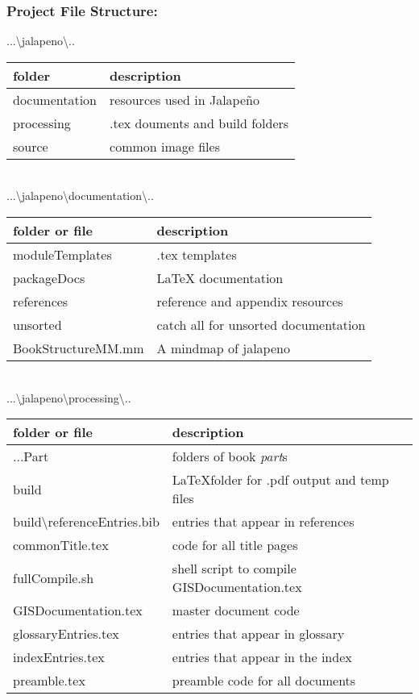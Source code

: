 \documentclass[class=book , crop=false]{standalone}
\begin{document}
\subsubsection{Project File Structure:}
{\Large ...\textbackslash jalapeno\textbackslash..}\\
\begin{tabular}{p{4cm}| p{7cm} }
\footnotesize folder & {\footnotesize description} \\ \hline
documentation & resources used in Jalape\~no\\
processing & .tex douments and build folders\\
source & common image files\\
\end{tabular}
\bigskip\\
{\Large ...\textbackslash jalapeno\textbackslash documentation\textbackslash..}\\
\begin{tabular}{p{4cm} | p{7cm} }
\footnotesize folder or file & {\footnotesize description} \\ \hline
moduleTemplates & .tex templates\\
packageDocs & \LaTeX{} documentation\\
references & reference and appendix resources\\
unsorted & catch all for unsorted documentation\\
BookStructureMM.mm & A mindmap of jalapeno\\
\end{tabular}
\bigskip\\
{\Large ...\textbackslash jalapeno\textbackslash processing\textbackslash..}\\
\begin{tabular}{p{4cm}| p{7cm} }
\footnotesize folder or file & {\footnotesize description }\\ \hline
...Part & folders of book \textit{part}s\\
build & \LaTeX{}folder for .pdf output and temp files \\
build\textbackslash referenceEntries.bib & entries that appear in references\\
commonTitle.tex & code for all title pages\\
fullCompile.sh & shell script to compile GISDocumentation.tex\\
GISDocumentation.tex & master document code\\
glossaryEntries.tex & entries that appear in glossary\\
indexEntries.tex & entries that appear in the index\\
preamble.tex & preamble code for all documents\\
\end{tabular}
\end{document}
